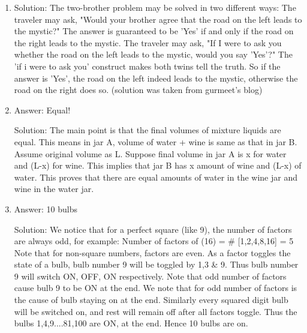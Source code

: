 \begin{enumerate}
\item
Solution: The two-brother problem may be solved in two different ways:
The traveler may ask, "Would your brother agree that the road on the left leads to the mystic?" The answer is guaranteed to be 'Yes' if and only if the road on the right leads to the mystic.
The traveler may ask, "If I were to ask you whether the road on the left leads to the mystic, would you say 'Yes'?" The 'if i were to ask you' construct makes both twins tell the truth. So if the answer is 'Yes', the road on the left indeed leads to the mystic, otherwise the road on the right does so.
(solution was taken from gurmeet's blog)




\item
Answer: Equal!
 
Solution: The main point is that the final volumes of mixture liquids are equal. This means in jar A, volume of water + wine is same as that in jar B. Assume original volume as L. Suppose final volume in jar A is x for water and (L-x) for wine. This implies that jar B has x amount of wine and (L-x) of water. This proves that there are equal amounts of water in the wine jar and wine in the water jar.




\item
Answer: 10 bulbs
 
Solution: We notice that for  a perfect square (like 9), the number of factors are always odd, for example:
Number of factors of (16) = \# [1,2,4,8,16] = 5
Note that for non-square numbers, factors are even.
As a factor toggles the state of a bulb, bulb number 9 will be toggled by 1,3 \& 9.  Thus bulb number 9 will switch ON, OFF, ON respectively. Note that odd number of factors cause bulb 9 to be ON at the end.
We note that for odd number of factors is the cause of bulb staying on at the end. Similarly every squared digit bulb will be switched on, and rest will remain off after all factors toggle. Thus the bulbs 1,4,9....81,100 are ON, at the end. Hence 10 bulbs are on.




\end{enumerate}
